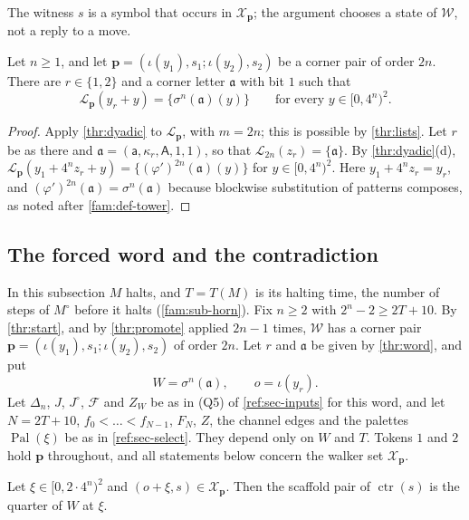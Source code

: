 The witness $s$ is a symbol that occurs in $\mathcal X_{\mathbf p}$; the argument chooses a state of $\mathcal W$, not a reply to a move.

\begin{lemma}\label{thr:word}
Let $n\ge1$, and let $\mathbf p=(\iota(y_1),s_1;\iota(y_2),s_2)$ be a corner pair of order $2n$. There are $r\in\{1,2\}$ and a corner letter $\mathfrak a$ with bit $1$ such that
\[
\mathcal L_{\mathbf p}(y_r+y)=\{\sigma^n(\mathfrak a)(y)\}\qquad\text{for every }y\in[0,4^n)^2 .
\]
\end{lemma}

\begin{proof}
Apply \cref{thr:dyadic} to $\mathcal L_{\mathbf p}$, with $m=2n$; this is possible by \cref{thr:lists}. Let $r$ be as there and $\mathfrak a=(\mathsf a,\kappa_r,\mathsf A,1,1)$, so that $\mathcal L_{2n}(z_r)=\{\mathfrak a\}$. By \cref{thr:dyadic}(d), $\mathcal L_{\mathbf p}(y_1+4^nz_r+y)=\{(\varphi')^{2n}(\mathfrak a)(y)\}$ for $y\in[0,4^n)^2$. Here $y_1+4^nz_r=y_r$, and $(\varphi')^{2n}(\mathfrak a)=\sigma^n(\mathfrak a)$ because blockwise substitution of patterns composes, as noted after \cref{fam:def-tower}.
\end{proof}

\subsection{The forced word and the contradiction}\label{thr:sec-end}

In this subsection $M$ halts, and $T=T(M)$ is its halting time, the number of steps of $M^\circ$ before it halts (\cref{fam:sub-horn}). Fix $n\ge2$ with $2^n-2\ge2T+10$. By \cref{thr:start}, and by \cref{thr:promote} applied $2n-1$ times, $\mathcal W$ has a corner pair $\mathbf p=(\iota(y_1),s_1;\iota(y_2),s_2)$ of order $2n$. Let $r$ and $\mathfrak a$ be given by \cref{thr:word}, and put
\[
W=\sigma^n(\mathfrak a),\qquad o=\iota(y_r).
\]
Let $\Delta_n$, $J$, $J^\circ$, $\mathcal F$ and $Z_W$ be as in (Q5) of \cref{ref:sec-inputs} for this word, and let $N=2T+10$, $f_0<\dots<f_{N-1}$, $F_N$, $Z$, the channel edges and the palettes $\operatorname{Pal}(\xi)$ be as in \cref{ref:sec-select}. They depend only on $W$ and $T$. Tokens $1$ and $2$ hold $\mathbf p$ throughout, and all statements below concern the walker set $\mathcal X_{\mathbf p}$.

\begin{lemma}\label{thr:quarters}
Let $\xi\in[0,2\cdot4^n)^2$ and $(o+\xi,s)\in\mathcal X_{\mathbf p}$. Then the scaffold pair of $\operatorname{ctr}(s)$ is the quarter of $W$ at $\xi$.
\end{lemma}

